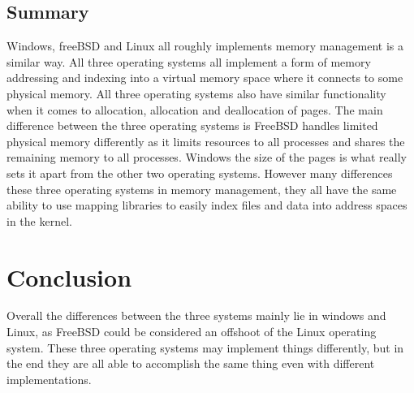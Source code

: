 \documentclass[onecolumn, draftclsnofoot, 10pt, titlepage, compsoc]{IEEEtran}
\begin{document}
\subsection{Summary}
Windows, freeBSD and Linux all roughly implements memory management is a similar way. All three operating systems all implement a form of memory addressing and indexing into a virtual memory space where it connects to some physical memory. All three operating systems also have similar functionality when it comes to allocation, allocation and deallocation of pages. The main difference between the three operating systems is FreeBSD handles limited physical memory differently as it limits resources to all processes and shares the remaining memory to all processes. Windows the size of the pages is what really sets it apart from the other two operating systems. However many differences these three operating systems in memory management, they all have the same ability to use mapping libraries to easily index files and data into address spaces in the kernel.

\section{Conclusion}
Overall the differences between the three systems mainly lie in windows and Linux, as FreeBSD could be considered an offshoot of the Linux operating system. These three operating systems may implement things differently, but in the end they are all able to accomplish the same thing even with different implementations.

\nocite{*}


\end{document}
